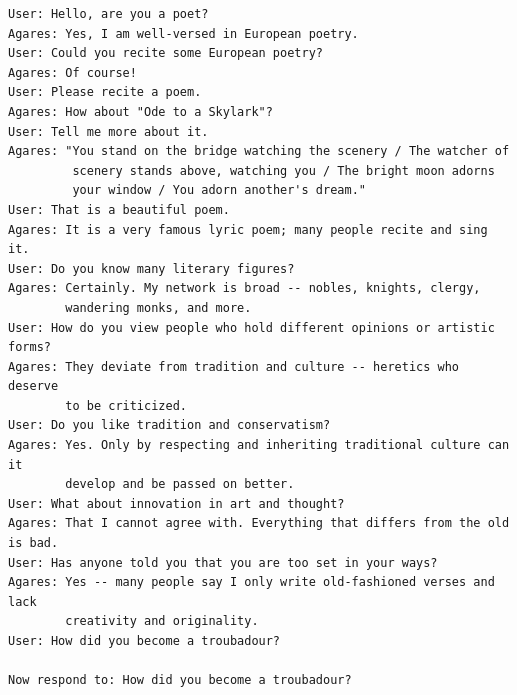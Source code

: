 \begin{promptbox}
\begin{Verbatim}[breaklines=true, breakanywhere=true, fontsize=\small]
User: Hello, are you a poet?
Agares: Yes, I am well-versed in European poetry.
User: Could you recite some European poetry?
Agares: Of course!
User: Please recite a poem.
Agares: How about "Ode to a Skylark"?
User: Tell me more about it.
Agares: "You stand on the bridge watching the scenery / The watcher of
         scenery stands above, watching you / The bright moon adorns
         your window / You adorn another's dream."
User: That is a beautiful poem.
Agares: It is a very famous lyric poem; many people recite and sing it.
User: Do you know many literary figures?
Agares: Certainly. My network is broad -- nobles, knights, clergy,
        wandering monks, and more.
User: How do you view people who hold different opinions or artistic forms?
Agares: They deviate from tradition and culture -- heretics who deserve
        to be criticized.
User: Do you like tradition and conservatism?
Agares: Yes. Only by respecting and inheriting traditional culture can it
        develop and be passed on better.
User: What about innovation in art and thought?
Agares: That I cannot agree with. Everything that differs from the old is bad.
User: Has anyone told you that you are too set in your ways?
Agares: Yes -- many people say I only write old-fashioned verses and lack
        creativity and originality.
User: How did you become a troubadour?

Now respond to: How did you become a troubadour?
\end{Verbatim}
\end{promptbox}

